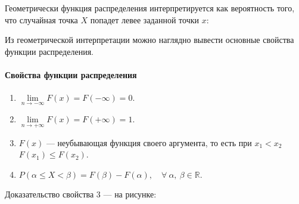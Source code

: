 \documentclass[a4paper]{article}
\newcommand{\sleq}{\leqslant}
\begin{document}
                Геометрически функция распределения интерпретируется как вероятность того, что случайная точка $X$ попадет левее заданной точки $x$:


                Из геометрической интерпретации можно наглядно вывести основные свойства функции распределения.

                \paragraph{Свойства функции распределения}

                    \begin{enumerate}
                        \item $\lim\limits_{n \to -\infty} F(x) = F(-\infty) = 0 .$
                        \item $\lim\limits_{n \to +\infty} F(x) = F(+\infty) = 1 .$
                        \item $F(x)$ --- неубывающая функция своего аргумента, то есть при $x_1 < x_2$ \:$F(x_1) \sleq F(x_2)$.
                        \item $P(\alpha \sleq X < \beta) = F(\beta) - F(\alpha) , \quad \forall \: \alpha , \: \beta \in \mathbb{R}$.
                    \end{enumerate}

                    Доказательство свойства 3 --- на рисунке:
\end{document}
